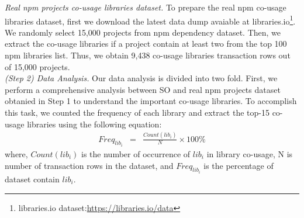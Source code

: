 \documentclass[paper]{ieice}
\begin{document}






\textit{Real npm projects co-usage libraries dataset.}
To prepare the real npm co-usage libraries dataset, first we download the latest data dump avaiable at libraries.io\footnote{libraries.io dataset:\url{https://libraries.io/data}}. 
We randomly select 15,000 projects from npm dependency dataset. 
Then, we extract the co-usage libraries if a project contain at least two from the top 100 npm libraries list. 
Thus, we obtain 9,438 co-usage libraries transaction rows out of 15,000 projects.
\\

\textit{(Step 2) Data Analysis. }Our data analysis is divided into two fold. First, we perform a comprehensive analysis between SO and real npm projects dataset obtanied in Step 1 to understand the important co-usage libraries. To accomplish this task, we counted the frequency of each library and extract the top-15 co-usage libraries using the following equation:
\begin{eqnarray}
    Freq_{lib_i} & = & {\frac{Count (lib_i)}{N}}\times 100\%
\end{eqnarray}
where, $Count (lib_i)$ is the number of occurrence of $lib_i$ in library co-usage, N is number of transaction rows in the dataset, and $Freq_{lib_i}$ is the percentage of dataset contain $lib_i$.
\end{document}
